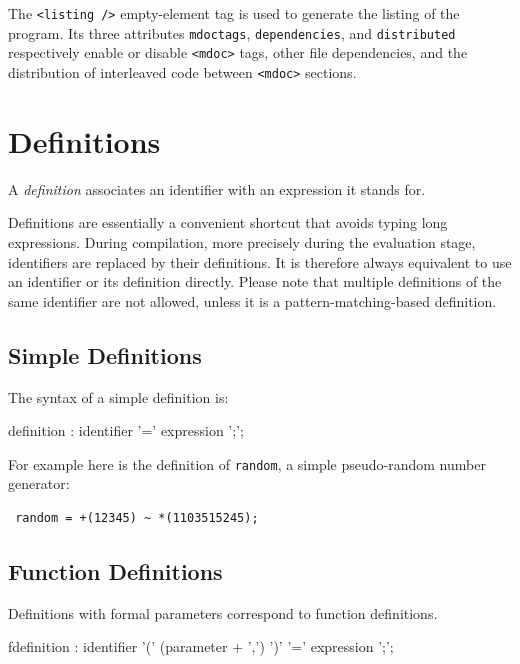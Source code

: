 The \lstinline'<listing />' empty-element tag is used to generate the listing of the \faust program. Its three attributes \lstinline'mdoctags', \lstinline'dependencies', and \lstinline'distributed' respectively enable or disable \lstinline'<mdoc>' tags, other file dependencies, and the distribution of interleaved \faust code between \lstinline'<mdoc>' sections.

\section{Definitions}

A \textit{definition} associates an identifier with an expression it stands for. 

Definitions are essentially a convenient shortcut that avoids typing long expressions. During compilation, more precisely during the evaluation stage, identifiers are replaced by their definitions. It is therefore always equivalent to use an identifier or its definition directly. Please note that multiple definitions of the same identifier are not allowed, unless it is a pattern-matching-based definition.

\subsection{Simple Definitions}

The syntax of a simple definition is:

\begin{rail}
definition  : identifier '=' expression ';';
\end{rail} 

For example here is the definition of \lstinline'random', a simple pseudo-random number generator:

\begin{lstlisting}
 random = +(12345) ~ *(1103515245);
\end{lstlisting}

\subsection{Function Definitions}

Definitions with formal parameters correspond to function definitions.

\begin{rail}
fdefinition  : identifier '(' (parameter + ',')  ')' '=' expression ';';
\end{rail} 

